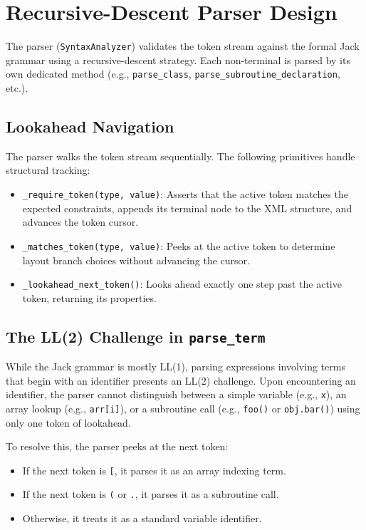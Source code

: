 \documentclass[11pt,a4paper]{article}
\begin{document}
\section{Recursive-Descent Parser Design}

The parser (\texttt{SyntaxAnalyzer}) validates the token stream against the formal Jack grammar using a recursive-descent strategy. Each non-terminal is parsed by its own dedicated method (e.g., \texttt{parse_class}, \texttt{parse_subroutine_declaration}, etc.).

\subsection{Lookahead Navigation}

The parser walks the token stream sequentially. The following primitives handle structural tracking:
\begin{itemize}
    \item \texttt{\_require\_token(type, value)}: Asserts that the active token matches the expected constraints, appends its terminal node to the XML structure, and advances the token cursor.
    \item \texttt{\_matches\_token(type, value)}: Peeks at the active token to determine layout branch choices without advancing the cursor.
    \item \texttt{\_lookahead\_next\_token()}: Looks ahead exactly one step past the active token, returning its properties.
\end{itemize}

\subsection{The LL(2) Challenge in \texttt{parse\_term}}

While the Jack grammar is mostly LL(1), parsing expressions involving terms that begin with an identifier presents an LL(2) challenge. Upon encountering an identifier, the parser cannot distinguish between a simple variable (e.g., \texttt{x}), an array lookup (e.g., \texttt{arr[i]}), or a subroutine call (e.g., \texttt{foo()} or \texttt{obj.bar()}) using only one token of lookahead.

To resolve this, the parser peeks at the next token:
\begin{itemize}
    \item If the next token is \texttt{[}, it parses it as an array indexing term.
    \item If the next token is \texttt{(} or \texttt{.}, it parses it as a subroutine call.
    \item Otherwise, it treats it as a standard variable identifier.
\end{itemize}
\end{document}
